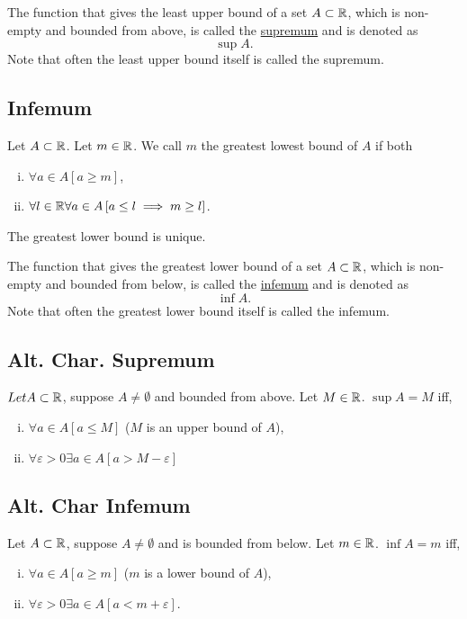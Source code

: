 The function that gives the least upper bound of a set $A \subset \mathbb{R}$, which is
non-empty and bounded from above, is called the \ul{supremum} and is denoted as
\begin{equation*}
    \sup A.
\end{equation*}
Note that often the least upper bound itself is called the supremum.


\subsection{Infemum}
Let $A \subset \mathbb{R}$. Let $m \in \mathbb{R}$. We call $m$ the greatest lowest bound of $A$ if both
\begin{enumerate}[(i)]
    \item $\forall a \in A \left[ a \geq m \right]$,
    \item $\forall l \in \mathbb{R} \forall a \in A \left[ a \leq l \implies m \geq l \right]$.
\end{enumerate}
The greatest lower bound is unique.

The function that gives the greatest lower bound of a set $A \subset \mathbb{R}$, which is
non-empty and bounded from below, is called the \ul{infemum} and is denoted as
\begin{equation*}
    \inf A.
\end{equation*}
Note that often the greatest lower bound itself is called the infemum.


\subsection{Alt. Char. Supremum}
\uthm $Let A \subset \mathbb{R}$, suppose $A \neq \emptyset$ and bounded from above.
Let $M \in \mathbb{R}$. $\sup A = M$ iff,
\begin{enumerate}[(i)]
    \item $\forall a \in A \left[ a \leq M \right]$ ($M$ is an upper bound of $A$),
    \item $\forall \varepsilon > 0 \exists a \in A \left[ a > M - \varepsilon \right]$
\end{enumerate}


\subsection{Alt. Char Infemum}
\uthm Let $A \subset \mathbb{R}$, suppose $A \neq \emptyset$ and is bounded from below.
Let $m \in \mathbb{R}$. $\inf A = m$ iff,
\begin{enumerate}[(i)]
    \item $\forall a \in A \left[ a \geq m \right]$ ($m$ is a lower bound of $A$),
    \item $\forall \varepsilon > 0 \exists a \in A \left[ a < m + \varepsilon \right]$.
\end{enumerate}


